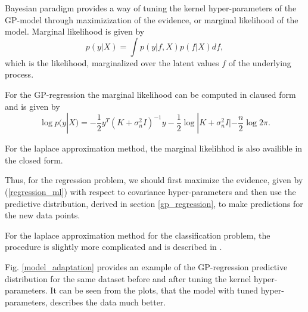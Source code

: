 Bayesian paradigm provides a way of tuning the kernel hyper-parameters of the GP-model through maximizization of the evidence, or marginal likelihood of the model. Marginal likelihood is given by
$$p(y | X) = \int p(y | f, X) p(f | X) df,$$
which is the likelihood, marginalized over the latent values $f$ of the underlying process.

For the GP-regression the marginal likelihood can be computed in claused form and is given by
\begin{equation}
	\label{regression_ml}
	\log p(y | X) = -\frac 1 2 y^{T} (K + \sigma_n^2 I)^{-1} y - \frac 1 2 \log |K + \sigma_n^2 I| - \frac n 2 \log 2 \pi.
\end{equation}

For the laplace approximation method, the marginal likelihhod is also availible in the closed form. 

Thus, for the regression problem, we should first maximize the evidence, given by (\ref{regression_ml}) with respect to covariance hyper-parameters and then use the predictive distribution, derived in section \ref{gp_regression}, to make predictions for the new data points.

For the laplace approximation method for the classification problem, the procedure is slightly more complicated and is described in \cite{GPinML}.

Fig. \ref{model_adaptation} provides an example of the GP-regression predictive distribution for the same dataset before and after tuning the kernel hyper-parameters. It can be seen from the plots, that the model with tuned hyper-parameters, describes the data much better.